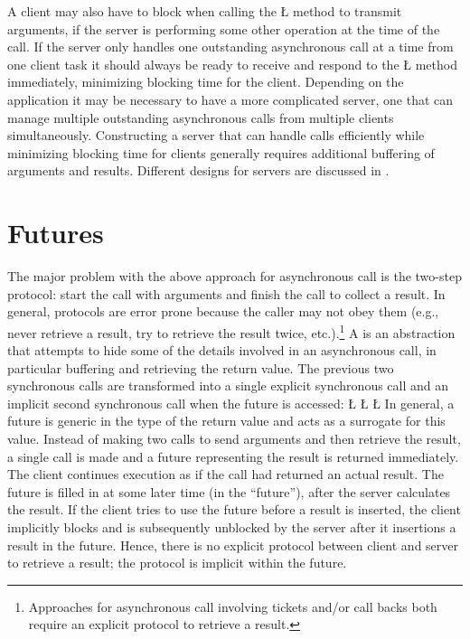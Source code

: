 \documentclass[openright,twoside]{report}
\begin{document}
A client may also have to block when calling the \LGinlinetrue\LGbegin\lgrinde\L{}\endlgrinde\LGend{} method to transmit arguments, if the server is performing some other operation at the time of the call.
If the server only handles one outstanding asynchronous call at a time from one client task it should always be ready to receive and respond to the \LGinlinetrue\LGbegin\lgrinde\L{}\endlgrinde\LGend{} method immediately, minimizing blocking time for the client.
Depending on the application it may be necessary to have a more complicated server, one that can manage multiple outstanding asynchronous calls from multiple clients simultaneously.
Constructing a server that can handle calls efficiently while minimizing blocking time for clients generally requires additional buffering of arguments and results.
Different designs for servers are discussed in .


\section{Futures}

The major problem with the above approach for asynchronous call is the two-step protocol: start the call with arguments and finish the call to collect a result.
In general, protocols are error prone because the caller may not obey them (e.g., never retrieve a result, try to retrieve the result twice, etc.).\footnote{
Approaches for asynchronous call involving tickets and/or call backs both require an explicit protocol to retrieve a result.}
A  is an abstraction that attempts to hide some of the details involved in an asynchronous call, in particular buffering and retrieving the return value.
The previous two synchronous calls are transformed into a single explicit synchronous call and an implicit second synchronous call when the future is accessed:
\LGinlinefalse\LGbegin\lgrinde
\L{}
\CE{}\L{}
\CE{}\L{}
\CE{}\endlgrinde\LGend
In general, a future is generic in the type of the return value and acts as a surrogate for this value.
Instead of making two calls to send arguments and then retrieve the result, a single call is made and a future representing the result is returned immediately.
The client continues execution as if the call had returned an actual result.
The future is filled in at some later time (in the ``future''), after the server calculates the result.
If the client tries to use the future before a result is inserted, the client implicitly blocks and is subsequently unblocked by the server after it insertions a result in the future.
Hence, there is no explicit protocol between client and server to retrieve a result;
the protocol is implicit within the future.
\end{document}
